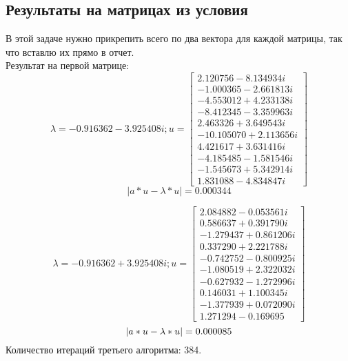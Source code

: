 \documentclass[a4paper,12pt,fleqn]{article}
\begin{document}
\subsection{Результаты на матрицах из условия}
В этой задаче нужно прикрепить всего по два вектора для каждой матрицы, так что вставлю их прямо в отчет.\\
Результат на первой матрице:\\
$$\lambda = -0.916362-3.925408i; 
u = 
\begin{bmatrix}
			2.120756 -8.134934i \\
-1.000365 -2.661813i\\
-4.553012 +4.233138i\\
-8.412345 -3.359963i\\
2.463326 +3.649543i\\
-10.105070 +2.113656i\\
4.421617 +3.631416i\\
-4.185485 -1.581546i\\
-1.545673 +5.342914i\\
1.831088 -4.834847i
\end{bmatrix}
$$
$$|a * u- \lambda * u| = 0.000344$$

$$\lambda = -0.916362+3.925408i; 
u = 
\begin{bmatrix}
			
2.084882-0.053561i\\
   0.586637+0.391790i\\
  -1.279437+0.861206i\\
   0.337290+2.221788i\\
 -0.742752-0.800925i\\
  -1.080519+2.322032i\\
 -0.627932-1.272996i\\
  0.146031+1.100345i\\
  -1.377939+0.072090i\\
  1.271294-0.169695
\end{bmatrix}
$$
$$\\|a * u- \lambda * u| = 0.000085
$$
Количество итераций третьего алгоритма: 384.\\
\end{document}
